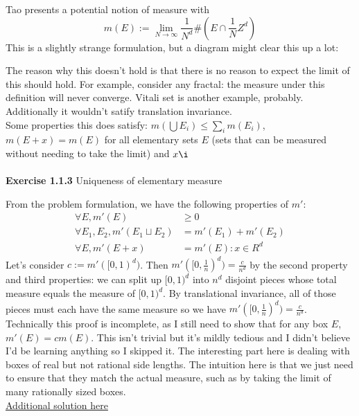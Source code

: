 \documentclass[answers,12pt]{exam}
\begin{document}
Tao presents a potential notion of measure with 
\begin{equation}
m(E) := \lim_{N \rightarrow \infty}\frac{1}{N^d}\#(E\cap \frac{1}{N}Z^d)    
\end{equation}
This is a slightly strange formulation, but a diagram might clear this up a lot:


The reason why this doesn't hold is that there is no reason to expect the limit of this should hold.
For example, consider any fractal: the measure under this definition will never converge. 
Vitali set is another example, probably.
Additionally it wouldn't satify translation invariance.\\
Some properties this does satisfy: $m(\bigcup E_i) \leq \sum_i m(E_i)$, $m(E+x) = m(E)$ for all elementary sets $E$ (sets that can be measured without needing to take the limit) and $x\i$\\ \\
\textbf{Exercise 1.1.3} Uniqueness of elementary measure
\begin{solution}
    From the problem formulation, we have the following properties of $m'$: 
    \[
        \begin{aligned}
        \forall E, m'(E) &\geq 0\\
        \forall E_1, E_2, m'(E_1\sqcup E_2) &= m'(E_1)+m'(E_2)\\
        \forall E, m'(E+x) &= m'(E): x \in R^d
        \end{aligned}
    \]
    Let's consider $c:=m'([0,1)^d)$. 
    Then $m'([0,\frac{1}{n})^d) = \frac{c}{n^d}$ by the second property and third properties: 
    we can split up $[0,1)^d$ into $n^d$ disjoint pieces whose total measure equals the measure of $[0,1)^d$.
    By translational invariance, all of those pieces must each have the same measure so we have $m'([0,\frac{1}{n})^d) = \frac{c}{n^d}$.\\
    Technically this proof is incomplete, as I still need to show that for any box $E$, $m'(E) = cm(E)$.
    This isn't trivial but it's mildly tedious and I didn't believe I'd be learning anything so I skipped it. 
    The interesting part here is dealing with boxes of real but not rational side lengths. 
    The intuition here is that we just need to ensure that they match the actual measure, such as by taking the limit of many rationally sized boxes.\\
    \href{https://math.solverer.com/library/terence_tao/an_introduction_to_measure_theory/exercise_1-1-3}{Additional solution here}
\end{solution}
\end{document}
